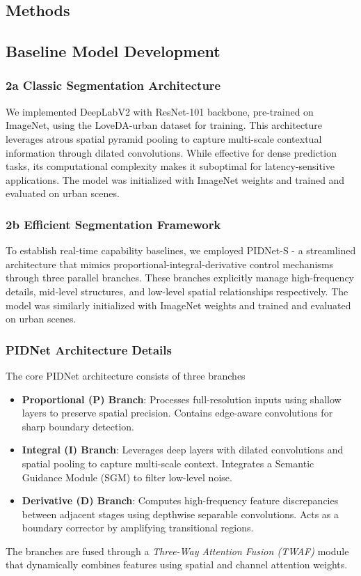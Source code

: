 \documentclass{article}
\begin{document}
\begin{multicols}{2}
		
		
\section{Methods}
\subsection{Baseline Model Development}
\subsubsection{2a Classic Segmentation Architecture } 
We implemented DeepLabV2  \cite{chen2018deeplab}  with ResNet-101 backbone, pre-trained on ImageNet, using the LoveDA-urban dataset for training. This architecture leverages atrous spatial pyramid pooling to capture multi-scale contextual information through dilated convolutions. While effective for dense prediction tasks, its computational complexity makes it suboptimal for latency-sensitive applications. The model was initialized with ImageNet weights and trained and evaluated on urban scenes.

\subsubsection{2b Efficient Segmentation Framework}
To establish real-time capability baselines, we employed PIDNet-S - a streamlined architecture that mimics proportional-integral-derivative control mechanisms through three parallel branches. These branches explicitly manage high-frequency details, mid-level structures, and low-level spatial relationships respectively. The model was similarly initialized with ImageNet weights and trained and evaluated on urban scenes.
\subsubsection{PIDNet Architecture Details}
The core PIDNet architecture \cite{pidnet2023} consists of three branches
\begin{itemize}
	\item \textbf{Proportional (P) Branch}: Processes full-resolution inputs using shallow layers to preserve spatial precision. Contains edge-aware convolutions for sharp boundary detection.
	\item \textbf{Integral (I) Branch}: Leverages deep layers with dilated convolutions and spatial pooling to capture multi-scale context. Integrates a Semantic Guidance Module (SGM) to filter low-level noise.
	\item \textbf{Derivative (D) Branch}: Computes high-frequency feature discrepancies between adjacent stages using depthwise separable convolutions. Acts as a boundary corrector by amplifying transitional regions.
\end{itemize}
The branches are fused through a \textit{Three-Way Attention Fusion (TWAF)} module that dynamically combines features using spatial and channel attention weights.
 

\end{multicols}
\end{document}
